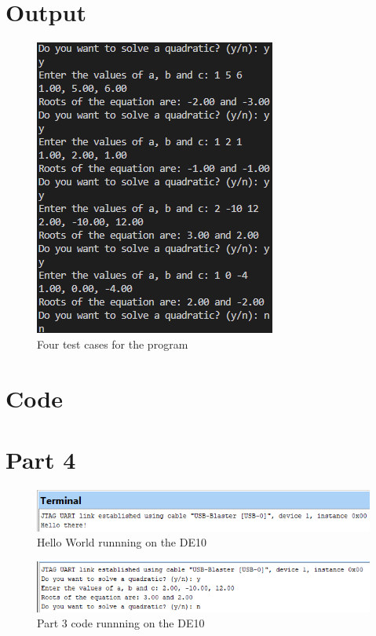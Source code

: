 \documentclass{article}
\begin{document}
\begin{flushleft}
  \section{Output}
  \begin{figure}[!h]
    \begin{centering}
      \includegraphics[scale=1]{P3_t1.png}
      \caption{Four test cases for the program}
    \end{centering}
  \end{figure}
  \section{Code}
  
\newpage
\section{Part 4}
\begin{figure}[!h]
    \begin{centering}
        \includegraphics[scale=0.5]{Test_Terminal.png}
        \caption{Hello World runnning on the DE10}
    \end{centering}
\end{figure}
\begin{figure}[!h]
    \begin{centering}
        \includegraphics[scale=0.5]{P4_output.png}
        \caption{Part 3 code runnning on the DE10}
    \end{centering}
\end{figure}
\end{flushleft}
\end{document}
